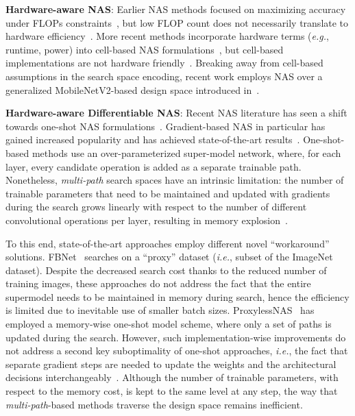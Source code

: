 \documentclass[runningheads]{llncs}
\begin{document}
\textbf{Hardware-aware NAS}: Earlier NAS methods focused 
on maximizing accuracy under FLOPs constraints~\cite{xie2018snas,zhou2018resource}, 
but low FLOP count does not necessarily translate to hardware 
efficiency~\cite{dong2018dpp,stamoulis2018hyperpower}.
More recent methods incorporate hardware terms (\textit{e.g.}, runtime, power)
into cell-based NAS formulations~\cite{dong2018dpp,hsu2018monas}, but 
cell-based implementations are not hardware friendly~\cite{wu2018fbnet}.
Breaking away from cell-based assumptions in the search space encoding, recent work 
employs NAS over a generalized MobileNetV2-based design space 
introduced in~\cite{tan2018mnasnet}.

\textbf{Hardware-aware Differentiable NAS}: 
Recent NAS literature has seen a shift towards one-shot 
NAS formulations~\cite{liu2018darts,pham2018efficient,xie2018snas}. 
Gradient-based NAS in particular has gained increased popularity and 
has achieved state-of-the-art results~\cite{brock2017smash}. One-shot-based 
methods use an over-parameterized super-model network, where, for each layer, every 
candidate operation is added as a separate trainable path.
Nonetheless, \textit{multi-path} 
search spaces have an intrinsic limitation: the number of trainable 
parameters that need to be maintained and updated with gradients 
during the search grows linearly with respect to the number of different
convolutional operations per layer, resulting in memory 
explosion~\cite{bender2018understanding,cai2018proxylessnas}.

To this end, state-of-the-art approaches employ different novel ``workaround'' solutions.
FBNet~\cite{wu2018fbnet} searches on a ``proxy'' dataset (\textit{i.e.},
subset of the ImageNet dataset). Despite the decreased search cost thanks 
to the reduced number of training images, these approaches do not address the fact 
that the entire supermodel needs to be maintained in memory during search, 
hence the efficiency is limited due to inevitable use of smaller batch sizes. 
ProxylessNAS~\cite{cai2018proxylessnas} has employed a memory-wise one-shot model 
scheme, where only a set of paths is updated during the search. However, such implementation-wise 
improvements do not address a second key suboptimality of one-shot approaches, 
\textit{i.e.}, the fact that separate gradient steps are needed to update the 
weights and the architectural decisions interchangeably~\cite{liu2018darts}. Although the 
number of trainable parameters, with respect to the memory cost, is kept to the same 
level at any step, the way that \textit{multi-path}-based methods traverse the 
design space remains inefficient. 
\end{document}
